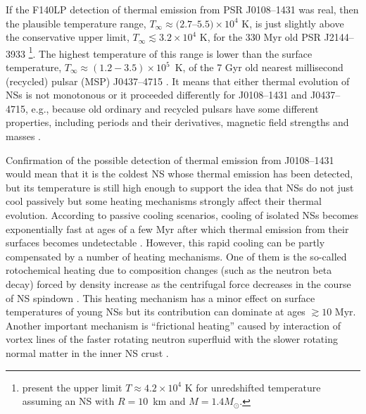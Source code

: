 \documentclass[pdftex,twocolumn]{aastex62}
\newcommand{\gp}[1]{{\color{blue} #1}}
\begin{document}
If the F140LP detection of thermal emission from PSR J0108--1431 was real, then 
the plausible temperature range, 
$T_\infty \approx (2.7$--$5.5)\times 10^4$ K, is just slightly above the conservative 
upper limit, $T_\infty \lesssim 3.2\times 10^4$ K, for the 330 Myr old PSR J2144--3933 \citep{Guillot2019}\footnote{\citet{Guillot2019} present the upper limit $T\approx 4.2\times 10^4$ K %
for 
unredshifted temperature assuming an NS with $R=10$~km and $M=1.4 M_\odot$.}. 
The highest temperature of this range is lower than the surface temperature, 
$T_\infty \approx (1.2-3.5)\times 10^5$~K,  
of the 7 Gyr old  nearest millisecond (recycled) pulsar 
(MSP) J0437--4715 \citep{2004karg,2012durant,2019gonzales}.
It means that either thermal evolution of NSs is not monotonous or it proceeded differently for J0108--1431 and J0437--4715, 
e.g., because  old ordinary and recycled pulsars 
have some different properties, including periods and their derivatives, magnetic field strengths and masses \citep{2015gonz}. 

Confirmation of the possible detection of thermal emission from J0108--1431 would mean that it is the coldest NS whose thermal emission has been detected, but 
its temperature is still high enough to support the idea that NSs do not just cool passively 
but some heating mechanisms strongly affect their thermal evolution. 
According to passive cooling scenarios, cooling of isolated NSs %
becomes exponentially fast
at ages of  a few  Myr after which  thermal emission from their surfaces %
becomes undetectable \citep[e.g.,][]{2004yp}. 
However, this rapid cooling can be partly  compensated by a number of heating mechanisms.
One of them is the so-called rotochemical heating due to composition changes (such as the neutron beta decay) forced by density increase as the centrifugal force decreases in the course of NS spindown 
\citep{
1995reiseng,2005fr}.
This heating mechanism has a minor effect on surface temperatures of young NSs but its contribution can  dominate at ages $\gtrsim 10$ Myr. 
Another important mechanism is ``frictional heating'' caused by interaction of vortex lines of the faster rotating neutron superfluid with the slower rotating normal matter in the inner NS crust \citep{1984Alpar,1999ll}.
\end{document}
